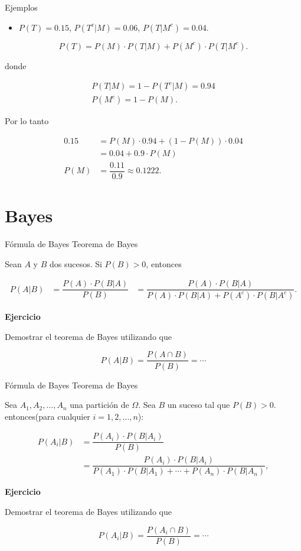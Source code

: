 \documentclass[
  ignorenonframetext,
]{beamer}
\providecommand{\tightlist}{%
  \setlength{\itemsep}{0pt}\setlength{\parskip}{0pt}}
\begin{document}
\begin{frame}{Ejemplos}
\protect\hypertarget{ejemplos-5}{}
\begin{itemize}
\tightlist
\item
  \(P(T)=0.15\), \(P(T^c|M)=0.06\), \(P(T|M^c)=0.04.\)
\end{itemize}

\[
P(T) =P(M)\cdot P(T|M)+P(M^c)\cdot P(T|M^c).
\]

donde

\[
\begin{array}{l}
P(T|M)=1-P(T^c|M)=0.94 \\
P(M^c)=1-P(M).
\end{array}
\]

Por lo tanto

\[
\begin{array}{rl}
0.15 & = P(M)\cdot 0.94+(1-P(M))\cdot 0.04\\
 & =0.04+0.9\cdot P(M)\\
P(M) & =\dfrac{0.11}{0.9}\approx 0.1222.
\end{array}
\]
\end{frame}

\hypertarget{bayes}{%
\section{Bayes}\label{bayes}}

\begin{frame}{Fórmula de Bayes}
\protect\hypertarget{fuxf3rmula-de-bayes}{}
Teorema de Bayes

Sean \(A\) y \(B\) dos sucesos. Si \(P(B)>0\), entonces

\[
\begin{array}{rl}
P(A|B) & =\dfrac{P(A)\cdot P(B|A)}{P(B)}
&=\dfrac{P(A)\cdot P(B|A)}{P(A)\cdot P(B|A)+P(A^c)\cdot P(B|A^c)}.
\end{array}
\]

\textbf{Ejercicio}

Demostrar el teorema de Bayes utilizando que

\[P(A|B) =\dfrac{P(A\cap B)}{P(B)}=\cdots\]
\end{frame}

\begin{frame}{Fórmula de Bayes}
\protect\hypertarget{fuxf3rmula-de-bayes-1}{}
Teorema de Bayes

Sea \(A_1,A_2,\ldots,A_n\) una partición de \(\Omega\). Sea \(B\) un
suceso tal que \(P(B)>0\). entonces(para cualquier \(i=1,2,\ldots,n\)):

\[
\begin{array}{rl}
P(A_i|B) & =\dfrac{P(A_i)\cdot P(B|A_i)}{P(B)}\\
& =\dfrac{P(A_i)\cdot P(B|A_i)}{P(A_1)\cdot P(B|A_1)+\cdots+P(A_n)\cdot P(B|A_n)},
\end{array}
\]

\textbf{Ejercicio}

Demostrar el teorema de Bayes utilizando que

\[P(A_i|B) =\dfrac{P(A_i\cap B)}{P(B)}=\cdots\]
\end{frame}
\end{document}
